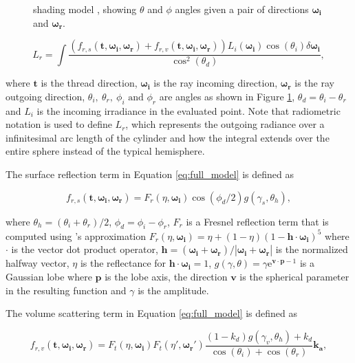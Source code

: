 \documentclass[12pt]{article}
\newcommand{\omegai}{\boldsymbol{\omega_i}}
\newcommand{\omegar}{\boldsymbol{\omega_r}}
\newcommand{\tb}{\mathbf{t}}
\begin{document}
\begin{figure}[ht!]
\begin{minipage}[b]{.45\textwidth}
	\caption{\citeauthor{Sadeghi2013} shading model \cite{Sadeghi2013}, showing $\theta$ and $\phi$ angles given a pair of directions $\omegai$ and $\omegar$.}
	\label{fig:cloth_directions}
\end{minipage}
\end{figure}

\begin{equation}
L_r = \int \frac{\left(f_{r,s}(\tb, \omegai, \omegar) + f_{r,v}(\tb,\omegai,\omegar)\right)L_i(\omegai)\cos(\theta_i)\delta \omegai}{\cos^2(\theta_d)},
\label{eq:full_model}
\end{equation}

where $\tb$ is the thread direction, $\omegai$ is the ray incoming direction, $\omegar$ is the ray outgoing direction, $\theta_i, ~\theta_r, ~ \phi_i \mbox{ and } \phi_r$ are angles as shown in Figure \ref{fig:cloth_directions},  $\theta_d = \theta_i-\theta_r$ and $L_i$ is the incoming irradiance in the evaluated point.
Note that radiometric notation \cite{Marschner2003} is used to define $L_r$, which represents the outgoing radiance over a infinitesimal arc length of the cylinder and how the integral extends over the entire sphere instead of the typical hemisphere.

The surface reflection term in Equation \ref{eq:full_model} is defined as

\begin{equation}
f_{r,s}(\tb, \omegai, \omegar) = F_r(\eta, \omegai) \cos(\phi_d/2)g(\gamma_s, \theta_h),
\end{equation}

where $\theta_h = (\theta_i+\theta_r)/2$, $\phi_d = \phi_i-\phi_r$, $F_r$ is a Fresnel reflection term that is computed using \citeauthor{Schlick1994}'s approximation \cite{Schlick1994} $F_r(\eta, \omegai) = \eta + (1 - \eta)(1 - \mathbf{h} \cdot \omegai)^5$ where $\cdot$ is the vector dot product operator, $\mathbf{h} = (\omegai + \omegar)/ \left|\omegai + \omegar \right|$ is the normalized halfway vector, $\eta$ is the reflectance for $\mathbf{h} \cdot \omegai = 1$, $g(\gamma, \theta) = \gamma \mathrm{e} ^{\mathbf{v} \cdot \mathbf{p}-1}$ is a Gaussian lobe \cite{Wang2009} where $\mathbf{p}$ is the lobe axis, the direction $\mathbf{v}$ is the spherical parameter in the resulting function and $\gamma$ is the amplitude.

The volume scattering term in Equation \ref{eq:full_model} is defined as

\begin{equation}
f_{r,v}(\tb,\omegai,\omegar) = F_t(\eta, \omegai) F_t(\eta', \omegar') \frac{(1-k_d)g(\gamma_v, \theta_h)+k_d}{\cos(\theta_i) + \cos(\theta_r)} \mathbf{k_a},
\end{equation}
\end{document}
